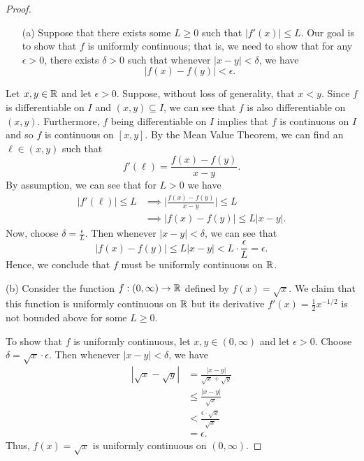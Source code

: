 \documentclass[a4paper]{article}
\begin{document}
\begin{proof}
\begin{enumerate}
    \item[(a)] Suppose that there exists some \( L \geq 0  \) such that \( | f'(x) |  \leq L  \). Our goal is to show that \( f  \) is uniformly continuous; that is, we need to show that for any \( \epsilon > 0  \), there exists \( \delta > 0  \) such that whenever \( | x - y  |  < \delta  \), we have
        \[  | f(x) - f(y) |  < \epsilon. \]
\end{enumerate}
Let \( x,y \in \mathbb{R}  \) and let \( \epsilon > 0  \). Suppose, without loss of generality, that \( x < y  \). Since \( f \) is differentiable on \( I  \) and \( (x,y) \subseteq  I  \), we can see that \( f  \) is also differentiable on \( (x,y) \). Furthermore, \( f  \) being differentiable on \( I \) implies that \( f  \) is continuous on \( I  \) and so \( f  \) is continuous on \( [x,y] \). By the Mean Value Theorem, we can find an \( \ell \in (x,y) \) such that   
\[  f'(\ell) = \frac{ f(x) - f(y) }{ x - y  }. \]
By assumption, we can see that for \( L > 0 \) we have 
\begin{align*}
| f'(\ell) | \leq L &\implies \Big|  \frac{ f(x) - f(y) }{ x - y  }  \Big| \leq L \\   
                    &\implies | f(x) - f(y) | \leq L | x - y |.
\end{align*} 
Now, choose \( \delta = \frac{ \epsilon  }{  L  }  \). Then whenever \( | x - y  |  < \delta \), we can see that 
\[  | f(x) - f(y)  |  \leq L | x - y  |  < L \cdot \frac{ \epsilon  }{  L  }   =  \epsilon. \]
Hence, we conclude that \( f  \) must be uniformly continuous on \( \mathbb{R}  \).
    \item[(b)] Consider the function \( f: (0,\infty ) \to \mathbb{R}  \) defined by \( f(x) = \sqrt{ x }  \). We claim that this function is uniformly continuous on \( \mathbb{R}  \) but its derivative \( f'(x) = \frac{ 1 }{ 2 }  x^{-1/2} \) is not bounded above for some \( L \geq 0  \). 

        To show that \( f  \) is uniformly continuous, let \( x,y \in (0,\infty )  \) and let \( \epsilon > 0  \). Choose \( \delta = \sqrt{  x  } \cdot  \epsilon \). Then whenever \( | x-  y  |  < \delta \), we have   
        \begin{align*}
            | \sqrt{ x }  - \sqrt{ y }  | &= \frac{ | x -y  |  }{  \sqrt{  x  }  + \sqrt{ y }  }  \\
                                          &\leq \frac{ | x- y  |   }{  \sqrt{ x  }  } \\ 
                                          &< \frac{ \epsilon \cdot \sqrt{ x }   }{ \sqrt{ x }  }  \\
                                          &= \epsilon.
        \end{align*}
        Thus, \( f(x) = \sqrt{ x }   \) is uniformly continuous on \( (0,\infty)  \).


\end{proof}
\end{document}
